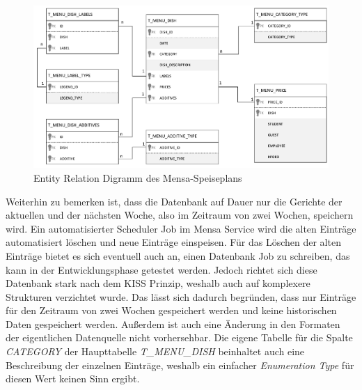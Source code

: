 \begin{figure}[H]
\centering
\includegraphics[width=\pictureWidth cm + 2cm]{Bilder/ER/Menu_ER.pdf}
\caption{Entity Relation Digramm des Mensa-Speiseplans\label{fig:ermensa}\protect\footnotemark}
\end{figure}

Weiterhin zu bemerken ist, dass die Datenbank auf Dauer nur die Gerichte der aktuellen und der nächsten Woche, also im Zeitraum von zwei Wochen, speichern wird. Ein automatisierter Scheduler Job im Mensa Service wird die alten Einträge automatisiert löschen und neue Einträge einspeisen. Für das Löschen der alten Einträge bietet es sich eventuell auch an, einen Datenbank Job zu schreiben, das kann in der Entwicklungsphase getestet werden. Jedoch richtet sich diese Datenbank stark nach dem \ac{KISS} Prinzip, weshalb auch auf komplexere Strukturen verzichtet wurde. Das lässt sich dadurch begründen, dass nur Einträge für den Zeitraum von zwei Wochen gespeichert werden und keine historischen Daten gespeichert werden. Außerdem ist auch eine Änderung in den Formaten der eigentlichen Datenquelle nicht vorhersehbar. Die eigene Tabelle für die Spalte \textit{CATEGORY} der Haupttabelle \textit{T_MENU_DISH} beinhaltet auch eine Beschreibung der einzelnen Einträge, weshalb ein einfacher \textit{Enumeration Type} für diesen Wert keinen Sinn ergibt.


